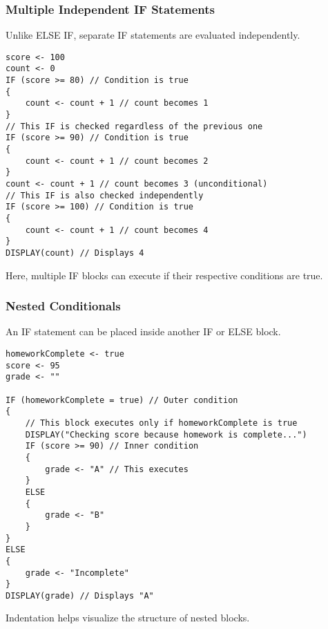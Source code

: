 \documentclass[11pt,oneside]{book}
\begin{document}
\subsubsection*{Multiple Independent IF Statements}
Unlike ELSE IF, separate IF statements are evaluated independently.
\begin{lstlisting}[language={}, label={lst:multiple_if}, caption={AP Pseudocode: Multiple Independent IFs}]
score <- 100
count <- 0
IF (score >= 80) // Condition is true
{
    count <- count + 1 // count becomes 1
}
// This IF is checked regardless of the previous one
IF (score >= 90) // Condition is true
{
    count <- count + 1 // count becomes 2
}
count <- count + 1 // count becomes 3 (unconditional)
// This IF is also checked independently
IF (score >= 100) // Condition is true
{
    count <- count + 1 // count becomes 4
}
DISPLAY(count) // Displays 4
\end{lstlisting}
Here, multiple IF blocks can execute if their respective conditions are true.

\subsubsection*{Nested Conditionals}
An IF statement can be placed inside another IF or ELSE block.
\begin{lstlisting}[language={}, label={lst:nested_if}, caption={AP Pseudocode: Nested IFs}]
homeworkComplete <- true
score <- 95
grade <- ""

IF (homeworkComplete = true) // Outer condition
{
    // This block executes only if homeworkComplete is true
    DISPLAY("Checking score because homework is complete...")
    IF (score >= 90) // Inner condition
    {
        grade <- "A" // This executes
    }
    ELSE
    {
        grade <- "B"
    }
}
ELSE
{
    grade <- "Incomplete"
}
DISPLAY(grade) // Displays "A"
\end{lstlisting}
Indentation helps visualize the structure of nested blocks.
\end{document}

